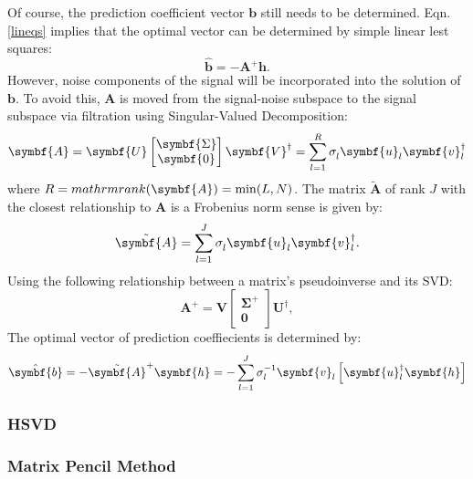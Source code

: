 Of course, the prediction coefficient vector $\symbf{b}$ still needs to be determined. Eqn. \ref{lineqs} implies that the optimal vector can be determined by simple linear lest squares:
\begin{equation}
  \hat{\symbf{b}} = - \mathbf{A}^+ \symbf{h}.
\end{equation}
However, noise components of the signal will be incorporated into the solution of $\symbf{b}$. To avoid this, $\symbf{A}$ is moved from the signal-noise subspace to the signal subspace via filtration using Singular-Valued Decomposition:
\begin{equation}
  \symbf{A} = \symbf{U}
  \begin{bmatrix}
    \symbf{\Sigma}\\
    \symbf{0}
  \end{bmatrix}
  \symbf{V}^{\dagger} = \sum_{l=1}^R \sigma_l^{\vphantom{\dagger}} \symbf{u}_l^{\vphantom{\dagger}} \symbf{v}_l^{\dagger}
\end{equation}
where $R = \\mathrm{rank}(\symbf{A}) = \min(L, N)$. The matrix $\tilde{\symbf{A}}$ of rank $J$ with the closest relationship to $\symbf{A}$ is a Frobenius norm sense is given by\cite{Cadzow1988}:
\begin{equation}
  \tilde{\symbf{A}} = \sum_{l=1}^J \sigma_l^{\vphantom{\dagger}} \symbf{u}_l^{\vphantom{\dagger}} \symbf{v}_l^{\dagger}.
\end{equation}
Using the following relationship between a matrix's pseudoinverse and its SVD:
\begin{equation}
  \symbf{A}^+ = \symbf{V}
  \begin{bmatrix}
    \symbf{\Sigma}^+\\
    \symbf{0}
  \end{bmatrix}
  \symbf{U}^{\dagger},
\end{equation}
The optimal vector of prediction coeffiecients is determined by:
\begin{equation}
  \hat{\symbf{b}} = - \tilde{\symbf{A}}^+ \symbf{h} = - \sum_{l=1}^J \sigma_l^{-1 \vphantom{\dagger}} \symbf{v}_l^{\vphantom{\dagger}} \left[ \symbf{u}_l^{\dagger} \symbf{h} \right]
\end{equation}

\subsubsection{HSVD}

\subsubsection{Matrix Pencil Method}

